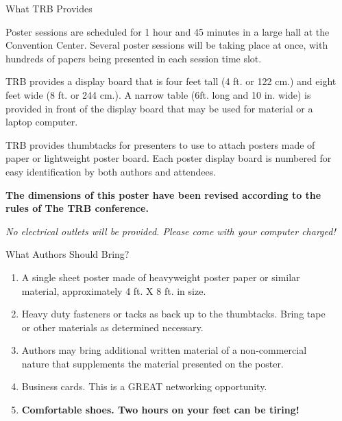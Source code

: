 \documentclass{article}
\begin{document}
\begin{frame}[t]
\begin{columns}[t]
\begin{column}{\colwidth}
  \begin{alertblock}{What TRB Provides}
   

    Poster sessions are scheduled for 1 hour and 45 minutes in a large hall at the Convention Center. Several poster sessions will be taking place at once, with hundreds of papers being presented in each session time slot.

    TRB provides a display board that is four feet tall (4 ft. or 122 cm.) and eight feet wide (8 ft. or 244 cm.). A narrow table (6ft. long and 10 in. wide) is provided in front of the display board that may be used for material or a laptop computer.
    
    TRB provides thumbtacks for presenters to use to attach posters made of paper or lightweight poster board. Each poster display board is numbered for easy identification by both authors and attendees.


    \textbf{The dimensions of this poster have been revised according to the rules of The TRB conference.}

    \textit{No electrical outlets will be provided. Please come with your computer charged!}

  \end{alertblock}

\begin{block}{What Authors Should Bring?}

    \begin{enumerate}
      \item A single sheet poster made of heavyweight poster paper or similar material, approximately 4 ft. X 8 ft. in size.
      \item Heavy duty fasteners or tacks as back up to the thumbtacks. Bring tape or other materials as determined necessary.
      \item Authors may bring additional written material of a non-commercial nature that supplements the material presented on the poster. 
      \item Business cards. This is a GREAT networking opportunity. 
      \item \textbf{Comfortable shoes. Two hours on your feet can be tiring!}
    \end{enumerate}

  \end{block}

\end{column}

\separatorcolumn

\begin{column}{\colwidth}


\end{column}
\end{columns}
\end{frame}
\end{document}
